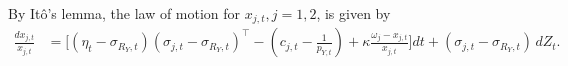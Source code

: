 \documentclass[12pt,english]{article}
\begin{document}
By It\^{o}'s lemma, the law of motion for $x_{j,t}, j=1,2$, is given by
\begin{align*}
    \frac{dx_{j,t}}{x_{j,t}} 
    &= \Big[ (\eta_t-\sigma_{R_Y,t}) \left( \sigma_{j,t} -\sigma_{R_Y,t} \right)^\top - \left( c_{j,t} - \frac{1}{p_{Y,t}}  \right)
        + \kappa \frac{\omega_j - x_{j,t}}{x_{j,t}} \Big] dt  
        + (\sigma_{j,t} - \sigma_{R_Y,t}) \, dZ_t.
\end{align*}





\end{document}
